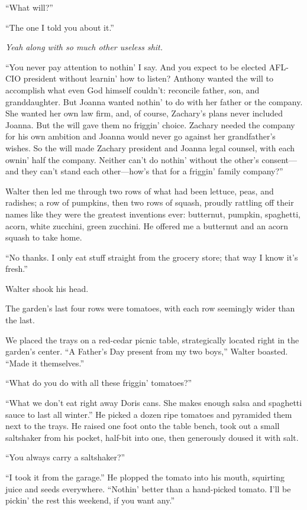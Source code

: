 ``What will?''

``The one I told you about it.''

\emph{Yeah along with so much other useless shit.}

``You never pay attention to nothin' I say. And you expect to be elected
AFL-CIO president without learnin' how to listen? Anthony wanted the
will to accomplish what even God himself couldn't: reconcile father,
son, and granddaughter. But Joanna wanted nothin' to do with her father
or the company. She wanted her own law firm, and, of course, Zachary's
plans never included Joanna. But the will gave them no friggin' choice.
Zachary needed the company for his own ambition and Joanna would never
go against her grandfather's wishes. So the will made Zachary president
and Joanna legal counsel, with each ownin' half the company. Neither
can't do nothin' without the other's consent---and they can't stand each
other---how's that for a friggin' family company?''

Walter then led me through two rows of what had been lettuce, peas, and
radishes; a row of pumpkins, then two rows of squash, proudly rattling
off their names like they were the greatest inventions ever: butternut,
pumpkin, spaghetti, acorn, white zucchini, green zucchini. He offered me
a butternut and an acorn squash to take home.

``No thanks. I only eat stuff straight from the grocery store; that way
I know it's fresh.''

Walter shook his head.

The garden's last four rows were tomatoes, with each row seemingly wider
than the last.

We placed the trays on a red-cedar picnic table, strategically located
right in the garden's center. ``A Father's Day present from my two
boys,'' Walter boasted. ``Made it themselves.''

``What do you do with all these friggin' tomatoes?''

``What we don't eat right away Doris cans. She makes enough salsa and
spaghetti sauce to last all winter.'' He picked a dozen ripe tomatoes
and pyramided them next to the trays. He raised one foot onto the table
bench, took out a small saltshaker from his pocket, half-bit into one,
then generously doused it with salt.

``You always carry a saltshaker?''

``I took it from the garage.'' He plopped the tomato into his mouth,
squirting juice and seeds everywhere. ``Nothin' better than a
hand-picked tomato. I'll be pickin' the rest this weekend, if you want
any.''


